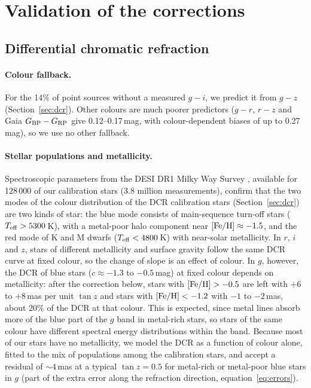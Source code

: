 \documentclass[usenatbib]{mnras}   %
\begin{document}
\section{Validation of the corrections} \label{app:corrections}

\subsection{Differential chromatic refraction} \label{app:dcr}

\paragraph*{Colour fallback.} For the 14\% of point sources without a measured $g-i$, we predict it from $g-z$ (Section~\ref{sec:dcr}). Other colours are much poorer predictors ($g-r$, $r-z$ and Gaia $G_{\rm BP} - G_{\rm RP}$ give 0.12--0.17\,mag, with colour-dependent biases of up to 0.27\,mag), so we use no other fallback.

\paragraph*{Stellar populations and metallicity.} Spectroscopic parameters from the DESI DR1 Milky Way Survey \citep{DESI_DR1, Koposov2024}, available for 128\,000 of our calibration stars (3.8 million measurements), confirm that the two modes of the colour distribution of the DCR calibration stars (Section~\ref{sec:dcr}) are two kinds of star: the blue mode consists of main-sequence turn-off stars ($T_{\rm eff} > 5300$\,K), with a metal-poor halo component near $[{\rm Fe/H}] \approx -1.5$, and the red mode of K and M dwarfs ($T_{\rm eff} < 4800$\,K) with near-solar metallicity. In $r$, $i$ and $z$, stars of different metallicity and surface gravity follow the same DCR curve at fixed colour, so the change of slope is an effect of colour. In $g$, however, the DCR of blue stars ($c \approx -1.3$ to $-0.5$\,mag) at fixed colour depends on metallicity: after the correction below, stars with $[{\rm Fe/H}] > -0.5$ are left with $+6$ to $+8$\,mas per unit $\tan z$ and stars with $[{\rm Fe/H}] < -1.2$ with $-1$ to $-2$\,mas, about 20\% of the DCR at that colour. This is expected, since metal lines absorb more of the blue part of the $g$ band in metal-rich stars, so stars of the same colour have different spectral energy distributions within the band. Because most of our stars have no metallicity, we model the DCR as a function of colour alone, fitted to the mix of populations among the calibration stars, and accept a residual of $\sim\!4$\,mas at a typical $\tan z = 0.5$ for metal-rich or metal-poor blue stars in $g$ (part of the extra error along the refraction direction, equation~\ref{eq:errors}).
\end{document}
